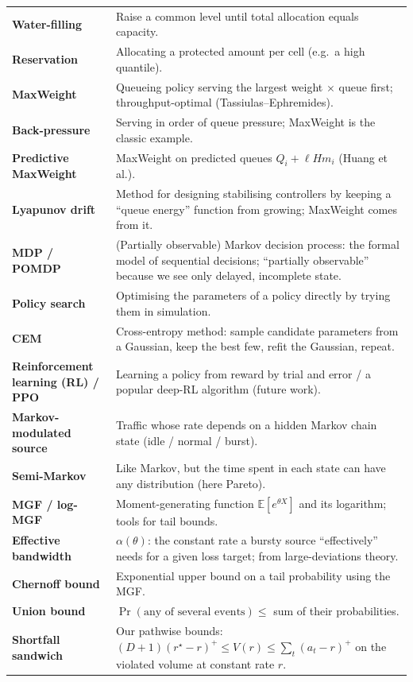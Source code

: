 \documentclass[11pt,a4paper]{article}
\newcommand{\rstar}{r^\star}
\begin{document}
\begin{longtable}{>{\raggedright\arraybackslash\bfseries}p{3.6cm}>{\raggedright\arraybackslash}p{12.2cm}}
Water-filling & Raise a common level until total allocation equals capacity. \\
Reservation & Allocating a protected amount per cell (e.g.\ a high quantile). \\
MaxWeight & Queueing policy serving the largest weight $\times$ queue first; throughput-optimal (Tassiulas--Ephremides). \\
Back-pressure & Serving in order of queue pressure; MaxWeight is the classic example. \\
Predictive MaxWeight & MaxWeight on predicted queues $Q_i + \ell H m_i$ (Huang et al.). \\
Lyapunov drift & Method for designing stabilising controllers by keeping a ``queue energy'' function from growing; MaxWeight comes from it. \\
MDP / POMDP & (Partially observable) Markov decision process: the formal model of sequential decisions; ``partially observable'' because we see only delayed, incomplete state. \\
Policy search & Optimising the parameters of a policy directly by trying them in simulation. \\
CEM & Cross-entropy method: sample candidate parameters from a Gaussian, keep the best few, refit the Gaussian, repeat. \\
Reinforcement learning (RL) / PPO & Learning a policy from reward by trial and error / a popular deep-RL algorithm (future work). \\
Markov-modulated source & Traffic whose rate depends on a hidden Markov chain state (idle / normal / burst). \\
Semi-Markov & Like Markov, but the time spent in each state can have any distribution (here Pareto). \\
MGF / log-MGF & Moment-generating function $\mathbb{E}[e^{\theta X}]$ and its logarithm; tools for tail bounds. \\
Effective bandwidth & $\alpha(\theta)$: the constant rate a bursty source ``effectively'' needs for a given loss target; from large-deviations theory. \\
Chernoff bound & Exponential upper bound on a tail probability using the MGF. \\
Union bound & $\Pr(\text{any of several events}) \le$ sum of their probabilities. \\
Shortfall sandwich & Our pathwise bounds: $(D+1)(\rstar - r)^+ \le V(r) \le \sum_t (a_t - r)^+$ on the violated volume at constant rate $r$. \\

\end{longtable}
\end{document}
